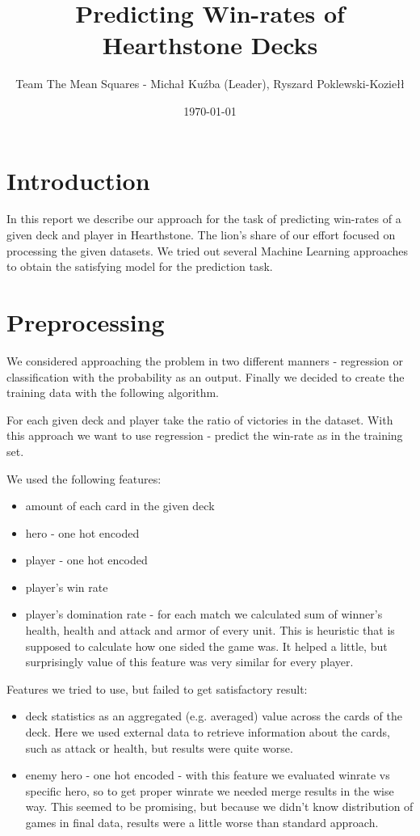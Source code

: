 \documentclass[a4paper]{article}
\title{Predicting Win-rates of Hearthstone Decks}
\author{Team The Mean Squares - Michał Kuźba (Leader), Ryszard Poklewski-Koziełł}
\date{\today}
\begin{document}
\maketitle

\section{Introduction}
\label{sec:introduction}
In this report we describe our approach for the task of predicting win-rates of a given deck and player in Hearthstone. 
The lion's share of our effort focused on processing the given datasets.
We tried out several Machine Learning approaches to obtain the satisfying model for the prediction task.

\section{Preprocessing}
We considered approaching the problem in two different manners - regression or classification with the probability as an output. 
Finally we decided to create the training data with the following algorithm.

For each given deck and player take the ratio of victories in the dataset.
With this approach we want to use regression - predict the win-rate as in the training set.

We used the following features:
\begin{itemize}
\item amount of each card in the given deck
\item hero - one hot encoded
\item player - one hot encoded
\item player's win rate
\item player's domination rate - for each match we calculated sum of winner's health, health and attack and armor of every unit. This is heuristic that is supposed to calculate how one sided the game was. It helped a little, but surprisingly value of this feature was very similar for every player.
\end{itemize}

Features we tried to use, but failed to get satisfactory result:
\begin{itemize}
\item deck statistics as an aggregated (e.g. averaged) value across the cards of the deck. Here we used external data \cite{cards_api} to retrieve information about the cards, such as attack or health, but results were quite worse.
\item enemy hero - one hot encoded - with this feature we evaluated winrate vs specific hero, so to get proper winrate we needed merge results in the wise way. This seemed to be promising, but because we didn't know distribution of games in final data, results were a little worse than standard approach.


\end{itemize}
\end{document}
